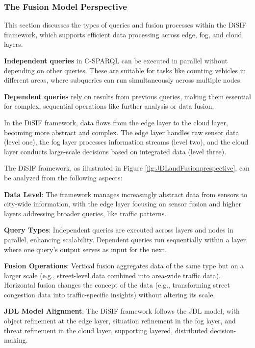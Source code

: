 \documentclass[5p,times]{elsarticle}
\begin{document}
\subsubsection{The Fusion Model Perspective}


This section discusses the types of queries and fusion processes within the DiSIF framework,
 which supports efficient data processing across edge, fog, and cloud layers.

\textbf{Independent queries} in C-SPARQL can be executed in parallel without depending on other queries.
 These are suitable for tasks like counting vehicles in different areas, where subqueries can run simultaneously across multiple nodes.

 \textbf{Dependent queries} rely on results from previous queries, making them essential for complex,
  sequential operations like further analysis or data fusion.

In the DiSIF framework, data flows from the edge layer to the cloud layer, becoming more abstract and complex.
 The edge layer handles raw sensor data (level one), the fog layer processes information streams (level two), 
 and the cloud layer conducts large-scale decisions based on integrated data (level three).

The DiSIF framework, as illustrated in Figure \ref{fig:JDLandFusionprespective}, can be analyzed from the following aspects:

\textbf{Data Level}: The framework manages increasingly abstract data from sensors to city-wide information,
 with the edge layer focusing on sensor fusion and higher layers addressing broader queries, like traffic patterns.

\textbf{Query Types}: Independent queries are executed across layers and nodes in parallel, enhancing scalability.
Dependent queries run sequentially within a layer, where one query’s output serves as input for the next.

\textbf{Fusion Operations}: Vertical fusion aggregates data of the same type but on a larger scale (e.g., street-level data combined into area-wide traffic
 data). Horizontal fusion changes the concept of the data (e.g., transforming street congestion data into traffic-specific insights) 
 without altering its scale.

\textbf{JDL Model Alignment}: The DiSIF framework follows the JDL model, with object refinement at the edge layer,
 situation refinement in the fog layer, and threat refinement in the cloud layer, supporting layered, distributed decision-making.
\end{document}
